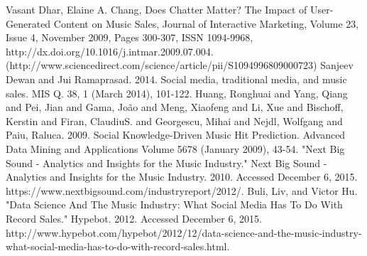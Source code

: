 \documentclass[conference]{IEEEtran}
\begin{document}
{%


%
%
%
\begin{thebibliography}{1}

Vasant Dhar, Elaine A. Chang, Does Chatter Matter? The Impact of User-Generated Content on Music Sales, Journal of Interactive Marketing, Volume 23, Issue 4, November 2009, Pages 300-307, ISSN 1094-9968, http://dx.doi.org/10.1016/j.intmar.2009.07.004.
(http://www.sciencedirect.com/science/article/pii/S1094996809000723)
Sanjeev Dewan and Jui Ramaprasad. 2014. Social media, traditional media, and music sales. MIS Q. 38, 1 (March 2014), 101-122.
Huang, Ronghuai and Yang, Qiang and Pei, Jian and Gama, João and Meng, Xiaofeng and Li, Xue and Bischoff, Kerstin and Firan, ClaudiuS. and Georgescu, Mihai and Nejdl, Wolfgang and Paiu, Raluca. 2009. Social Knowledge-Driven Music Hit Prediction. Advanced Data Mining and Applications Volume 5678 (January 2009), 43-54.
"Next Big Sound - Analytics and Insights for the Music Industry." Next Big Sound - Analytics and Insights for the Music Industry. 2010. Accessed December 6, 2015. https://www.nextbigsound.com/industryreport/2012/.
Buli, Liv, and Victor Hu. "Data Science And The Music Industry: What Social Media Has To Do With Record Sales." Hypebot. 2012. Accessed December 6, 2015. http://www.hypebot.com/hypebot/2012/12/data-science-and-the-music-industry-what-social-media-has-to-do-with-record-sales.html.




\end{thebibliography}

}
\end{document}
